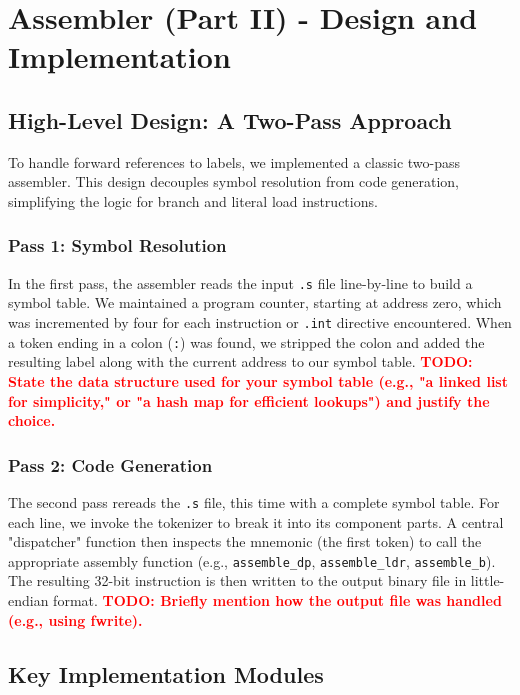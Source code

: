 \documentclass[11pt]{article}
\newcommand{\todo}[1]{\textcolor{red}{\textbf{TODO: #1}}}
\begin{document}
\section{Assembler (Part II) - Design and Implementation}

\subsection{High-Level Design: A Two-Pass Approach}

To handle forward references to labels, we implemented a classic two-pass assembler. This design decouples symbol resolution from code generation, simplifying the logic for branch and literal load instructions.

\subsubsection{Pass 1: Symbol Resolution}
In the first pass, the assembler reads the input \texttt{.s} file line-by-line to build a symbol table. We maintained a program counter, starting at address zero, which was incremented by four for each instruction or \texttt{.int} directive encountered. When a token ending in a colon (\texttt{:}) was found, we stripped the colon and added the resulting label along with the current address to our symbol table. 
\todo{State the data structure used for your symbol table (e.g., "a linked list for simplicity," or "a hash map for efficient lookups") and justify the choice.}

\subsubsection{Pass 2: Code Generation}
The second pass rereads the \texttt{.s} file, this time with a complete symbol table. For each line, we invoke the tokenizer to break it into its component parts. A central "dispatcher" function then inspects the mnemonic (the first token) to call the appropriate assembly function (e.g., \texttt{assemble\_dp}, \texttt{assemble\_ldr}, \texttt{assemble\_b}). The resulting 32-bit instruction is then written to the output binary file in little-endian format.
\todo{Briefly mention how the output file was handled (e.g., using fwrite).}


\subsection{Key Implementation Modules}
\end{document}

